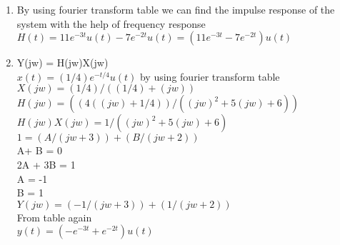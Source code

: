 \documentclass[10pt,a4paper, margin=1in]{article}
\begin{document}
\begin{enumerate}
\begin{enumerate}
    
    \item %
    By using fourier transform table we can find the impulse response of the system with the help of frequency response
    $ H(t) = 11e^{-3t} u(t) -7e^{-2t}u(t) = (11e^{-3t} -7e^{-2t})u(t)$
    \item %
    Y(jw) = H(jw)X(jw) \\
    $x(t) = (1/4) e^{-t/4}u(t) $ by using fourier transform table  $ X(jw)= (1/4) / ((1/4)+(jw))$ \\
    $H(jw) = ( (4((jw)+1/4)) / ((jw)^2 + 5(jw) +6) )$\\
    $H(jw)X(jw) = 1/((jw)^2 + 5(jw) +6)$ \\
    $1 = (A / (jw+3)) + (B / (jw+2))$ \\
    A+ B = 0\\
    2A + 3B = 1\\
    A = -1 \\
    B = 1 \\
    $Y(jw) = (-1/(jw+3)) + (1 / (jw+2)) $ \\
    From table again \\
    $y(t) = (-e^{-3t} + e^{-2t})u(t)$
    
    \end{enumerate}






\end{enumerate}
\end{document}
